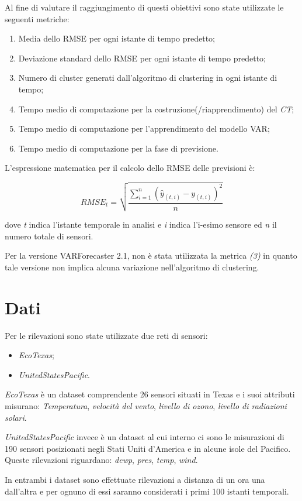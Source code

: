 \documentclass[12pt,a4paper,oneside,openright]{book}
\begin{document}
Al fine di valutare il raggiungimento di questi obiettivi sono state utilizzate le seguenti metriche:
\begin{enumerate}
\item Media dello RMSE per ogni istante di tempo predetto;
\item Deviazione standard dello RMSE per ogni istante di tempo predetto;
\item Numero di cluster generati dall'algoritmo di clustering in ogni istante di tempo;
\item Tempo medio di computazione per la costruzione(/riapprendimento) del \textit{CT};
\item Tempo medio di computazione per l'apprendimento del modello VAR;
\item Tempo medio di computazione per la fase di previsione.
\end{enumerate}
L'espressione matematica per il calcolo dello RMSE delle previsioni è:

$$RMSE_t = \sqrt{\frac{\sum_{i=1}^{n}{(\hat{y}_{(t,i)} - y_{(t,i)})^2}}{n}}$$

dove \textit{t} indica l'istante temporale in analisi e \textit{i} indica l'i-esimo sensore ed \textit{n} il numero totale di sensori.

Per la versione VARForecaster 2.1, non è stata utilizzata la metrica \textit{(3)} in quanto tale versione non implica alcuna variazione nell'algoritmo di clustering.

\newpage
\section{Dati}
Per le rilevazioni sono state utilizzate due reti di sensori:
\begin{itemize}
\item \textit{EcoTexas};
\item \textit{UnitedStatesPacific}.
\end{itemize} 
\textit{EcoTexas} è un dataset comprendente 26 sensori situati in Texas e i suoi attributi misurano: \textit{Temperatura}, \textit{velocità del vento}, \textit{livello di ozono}, \textit{livello di radiazioni solari}.

\textit{UnitedStatesPacific} invece è un dataset al cui interno ci sono le misurazioni di 190 sensori posizionati negli Stati Uniti d'America e in alcune isole del Pacifico. Queste rilevazioni riguardano: \textit{dewp}, \textit{pres}, \textit{temp}, \textit{wind}.

In entrambi i dataset sono effettuate rilevazioni a distanza di un ora una dall'altra e per ognuno di essi saranno considerati i primi 100 istanti temporali.
\newpage
\end{document}
